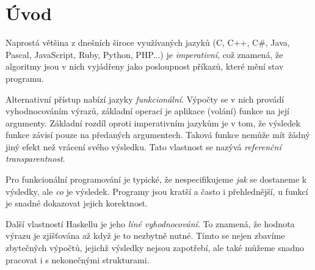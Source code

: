 \chapter{Úvod}

Naprostá většina z dnešních široce využívaných jazyků (C, C++, C\#, Java,
Pascal, JavaScript, Ruby, Python, PHP...) je \emph{imperativní}, což znamená, že
algoritmy jsou v nich vyjádřeny jako posloupnost příkazů, které mění stav
programu.

Alternativní přístup nabízí jazyky \emph{funkcionální}. Výpočty se v nich
provádí vyhodnocováním výrazů, základní operací je aplikace (volání) funkce na
její argumenty. Základní rozdíl oproti imperativním jazykům je v tom, že
výsledek funkce závisí pouze na předaných argumentech. Taková funkce nemůže mít
žádný jiný efekt než vrácení svého výsledku. Tato vlastnost se nazývá
\emph{referenční transparentnost}.

Pro funkcionální programování je typické, že nespecifikujeme \emph{jak} se
dostaneme k výsledky, ale \emph{co} je výsledek. Programy jsou kratší a často i
přehlednější, u funkcí je snadné dokazovat jejich korektnost.


Další vlastností Haskellu je jeho \emph{líné vyhodnocování}. To znamená, že
hodnota výrazu je zjišťována až když je to nezbytně nutné. Tímto se nejen
zbavíme zbytečných výpočtů, jejichž výsledky nejsou zapotřebí, ale také můžeme
snadno pracovat i s nekonečnými strukturami.

